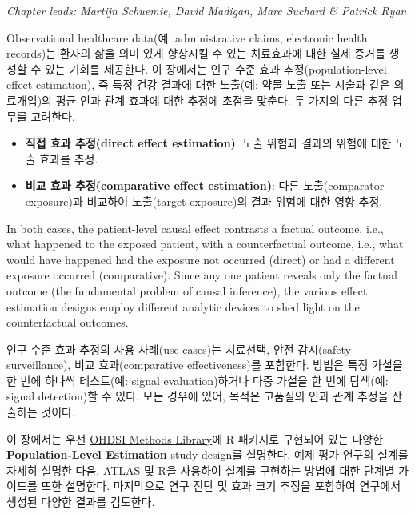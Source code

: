 \documentclass[11pt]{book}
\providecommand{\tightlist}{%
  \setlength{\itemsep}{0pt}\setlength{\parskip}{0pt}}
\theoremstyle{definition}
\theoremstyle{definition}
\theoremstyle{definition}
\theoremstyle{remark}
\begin{document}
\emph{Chapter leads: Martijn Schuemie, David Madigan, Marc Suchard \&
Patrick Ryan}


Observational healthcare data(예: administrative claims, electronic
health records)는 환자의 삶을 의미 있게 향상시킬 수 있는 치료효과에 대한
실제 증거를 생성할 수 있는 기회를 제공한다. 이 장에서는 인구 수준 효과
추정(population-level effect estimation), 즉 특정 건강 결과에 대한
노출(예: 약물 노출 또는 시술과 같은 의료개입)의 평균 인과 관계 효과에
대한 추정에 초점을 맞춘다. 두 가지의 다른 추정 업무를 고려한다.

\begin{itemize}
\tightlist
\item
  \textbf{직접 효과 추정(direct effect estimation)}: 노출 위험과 결과의
  위험에 대한 노출 효과를 추정. 
\item
  \textbf{비교 효과 추정(comparative effect estimation)}: 다른
  노출(comparator exposure)과 비교하여 노출(target exposure)의 결과
  위험에 대한 영향 추정. 
\end{itemize}

In both cases, the patient-level causal effect contrasts a factual
outcome, i.e., what happened to the exposed patient, with a
counterfactual outcome, i.e., what would have happened had the exposure
not occurred (direct) or had a different exposure occurred
(comparative). Since any one patient reveals only the factual outcome
(the fundamental problem of causal inference), the various effect
estimation designs employ different analytic devices to shed light on
the counterfactual outcomes. 

인구 수준 효과 추정의 사용 사례(use-cases)는 치료선택, 안전 감시(safety
surveillance), 비교 효과(comparative effectiveness)를 포함한다. 방법은
특정 가설을 한 번에 하나씩 테스트(예: signal evaluation)하거나 다중
가설을 한 번에 탐색(예: signal detection)할 수 있다. 모든 경우에 있어,
목적은 고품질의 인과 관계 추정을 산출하는 것이다.

이 장에서는 우선 \href{https://ohdsi.github.io/MethodsLibrary/}{OHDSI
Methods Library}에 R 패키지로 구현되어 있는 다양한
\textbf{Population-Level Estimation} study design를 설명한다. 예제 평가
연구의 설계를 자세히 설명한 다음, ATLAS 및 R을 사용하여 설계를 구현하는
방법에 대한 단계별 가이드를 또한 설명한다. 마지막으로 연구 진단 및 효과
크기 추정을 포함하여 연구에서 생성된 다양한 결과를 검토한다.
\end{document}
